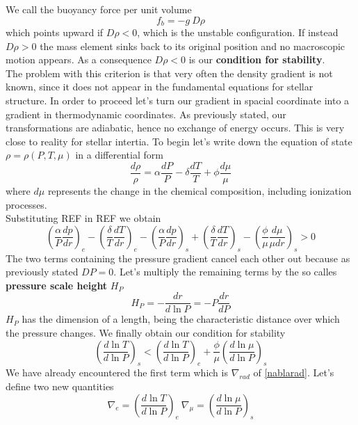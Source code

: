 \documentclass[11pt]{article}
\begin{document}
We call the buoyancy force per unit volume 
$$
f_b=- g \ D \rho
$$
which points upward if $D \rho < 0$, which is the unstable configuration. If instead $D \rho > 0$ the mass element sinks back to its original position and no macroscopic motion appears. As a consequence $D \rho<0$ is our \textbf{condition for stability}.\\
The problem with this criterion is that very often the density gradient is not known, since it does not appear in the fundamental equations for stellar structure. In order to proceed let's turn our gradient in spacial coordinate into a gradient in thermodynamic coordinates. As previously stated, our transformations are adiabatic, hence no exchange of energy occurs. This is very close to reality for stellar intertia. To begin let's write down the equation of state $\rho = \rho (P, T, \mu)$ in a differential form
\begin{equation}\label{EoSdiff}
	\frac{d \rho}{\rho} = \alpha \frac{d P}{P} - \delta \frac{d T}{T} + \phi \frac{d \mu}{\mu}
\end{equation}
where $d \mu$ represents the change in the chemical composition, including ionization processes. \\
Substituting REF in REF we obtain
\begin{equation}
	\left (\frac{\alpha}{P} \frac{dp}{dr}\right )_e - \left ( \frac{\delta}{T}\frac{dT}{dr}\right )_e -  \left (\frac{\alpha}{P} \frac{dp}{dr}\right )_s +  \left ( \frac{\delta}{T}\frac{dT}{dr}\right )_s -  \left ( \frac{\phi}{\mu}\frac{d \mu}{\mu dr}\right )_s>0 
\end{equation}
The two terms containing the pressure gradient cancel each other out because as previously stated $DP=0$. Let's multiply the remaining terms by the so calles \textbf{pressure scale height} $H_P$
\begin{equation}\label{scaleheight}
	H_P=-\frac{dr}{d \ln P}= - P \frac{dr}{dP}
\end{equation}
$H_P$ has the dimension of a length, being the characteristic distance over which the pressure changes.
We finally obtain our condition for stability
\begin{equation}\label{criterionstab}
	\left (   \frac{d \ln T}{d \ln P}    \right )_s <  \left (   \frac{d \ln T}{d \ln P}   \right )_e +  \frac{\phi}{\mu} \left (   \frac{d \ln \mu}{d \ln P}    \right )_s
\end{equation}
We have already encountered the first term which is $\nabla_{rad}$ of \ref{nablarad}.
Let's define two new quantities
\begin{equation}\label{nablas}
	\nabla_{e} = \left (  \frac{d \ln T}{d \ln P}   \right )_e \  \nabla_{\mu} = \left (  \frac{d \ln \mu}{d \ln P}   \right )_s
\end{equation}
\end{document}
